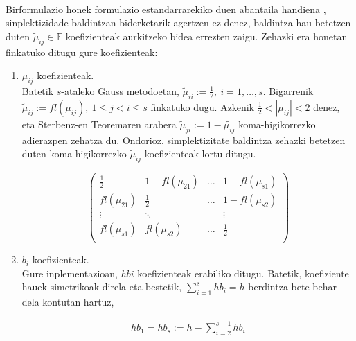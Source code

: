 \paragraph*{} Birformulazio honek formulazio estandarrarekiko duen abantaila handiena , sinplektizidade baldintzan biderketarik agertzen ez denez,  baldintza hau betetzen duten $\tilde \mu_{ij} \in \mathbb{F}$ koefizienteak aurkitzeko bidea errezten zaigu. Zehazki era honetan finkatuko ditugu gure koefizienteak:

\begin{enumerate}
\item $\mu_{ij}$ koefizienteak.\\

Batetik $s$-ataleko Gauss metodoetan, $\tilde \mu_{ii}:=\frac{1}{2}, \ i=1,\dots,s$. Bigarrenik $\tilde \mu_{ij}:=fl(\mu_{ij}), \ 1 \le j < i \le s$ finkatuko dugu. Azkenik $\frac{1}{2} < |\mu_{ij}| <2$ denez, eta Sterbenz-en Teoremaren arabera  $\tilde \mu_{ji}:=1-\tilde{\mu_{ij}}$ koma-higikorrezko adierazpen zehatza du. Ondorioz, simplektizitate baldintza zehazki betetzen duten koma-higikorrezko $\tilde \mu_{ij}$ koefizienteak lortu ditugu.   

\begin{equation}
\left(\begin{array}{cccc}
    \frac{1}{2}       & 1-fl(\mu_{21}) & \dots & 1-fl(\mu_{s1})      \\
    fl(\mu_{21})      & \frac{1}{2}    & \dots & 1-fl(\mu_{s2})      \\
    \vdots            & \ddots         &       & \vdots              \\
    fl(\mu_{s1})      & fl(\mu_{s2})   & \dots & \frac{1}{2}          \\ 
     \end{array}\right)
\end{equation}

\item $b_{i}$ koefizienteak.\\

Gure inplementazioan, $hbi$ koefizienteak erabiliko ditugu. Batetik, koefiziente hauek simetrikoak direla eta bestetik, $\sum\limits_{i=1}^{s} hb_i=h$ berdintza bete behar dela kontutan hartuz,

\begin{eqnarray}
hb_1=hb_s:= h - \sum\limits_{i=2}^{s-1} hb_i
\end{eqnarray}


\end{enumerate}

